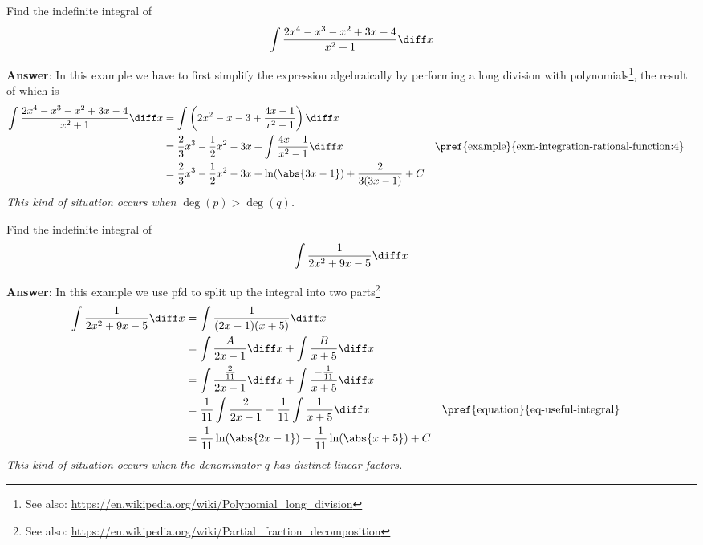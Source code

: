 \begin{exm}\label{exm-integration-rational-function:1}
	Find the indefinite integral of
	\begin{equation*}
		\int \frac{2x^4-x^3-x^2+3x-4}{x^2+1} \diff x
	\end{equation*}
	\begin{flushleft}
		\textbf{Answer}: In this example we have to first simplify the expression
		algebraically by performing a long division with polynomials\footnote{See
			also: \url{https://en.wikipedia.org/wiki/Polynomial_long_division}}, the
		result of which is
		\begin{align*}
			\int \frac{2x^4-x^3-x^2+3x-4}{x^2+1} \diff x
			 & = \int \left(2x^2-x-3+\frac{4x-1}{x^2-1}\right) \diff x                                                                                       \\
			 & = \frac{2}{3}x^3 -\frac{1}{2}x^2-3x + \int \frac{4x-1}{x^2-1} \diff x         &  & \text{\pref{example}{exm-integration-rational-function:4}} \\
			 & = \frac{2}{3}x^3 -\frac{1}{2}x^2-3x + \ln(\abs{3x-1}) + \frac{2}{3(3x-1)} + C
		\end{align*}
		\textit{This kind of situation occurs when $\deg(p)>\deg(q)$.}
	\end{flushleft}
\end{exm}

\begin{exm}\label{exm-integration-rational-function:2}
	Find the indefinite integral of
	\begin{equation*}
		\int \frac{1}{2x^2+9x-5} \diff x
	\end{equation*}
	\begin{flushleft}
		\textbf{Answer}: In this example we use \gls{pfd} to split up the integral
		into two parts\footnote{See also: \url{https://en.wikipedia.org/wiki/Partial_fraction_decomposition}}
		\begin{align*}
			\int \frac{1}{2x^2+9x-5} \diff x
			 & = \int \frac{1}{(2x-1)(x+5)} \diff x                                                                                              \\
			 & = \int \frac{A}{2x-1} \diff x + \int \frac{B}{x+5} \diff x                                                                        \\
			 & = \int \frac{\frac{2}{11}}{2x-1} \diff x + \int \frac{-\frac{1}{11}}{x+5} \diff x                                                 \\
			 & = \frac{1}{11}\int \frac{2}{2x-1} - \frac{1}{11} \int \frac{1}{x+5} \diff x       &  & \text{\pref{equation}{eq-useful-integral}} \\
			 & = \frac{1}{11}\ln(\abs{2x-1}) - \frac{1}{11}\ln(\abs{x+5}) + C
		\end{align*}
		\textit{This kind of situation occurs when the denominator $q$ has distinct
			linear factors.}
	\end{flushleft}
\end{exm}

